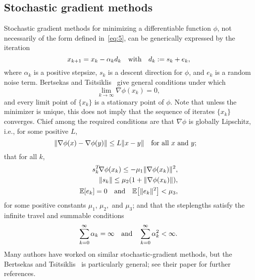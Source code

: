\documentclass[nospthms]{svjour3}
\numberwithin{equation}{section}
\def\norm#1{\|#1\|}
\def\text #1{\hbox{\quad#1\quad}}
\def\T{^T\!}
\def\k{_k}
\def\kp#1{_{k+#1}}
\def\expval{\mathbb{E}}
\begin{document}
\subsection{Stochastic gradient methods}
\label{sec:stochastic}

Stochastic gradient methods for minimizing a differentiable function
$\phi$, not necessarily of the form defined in~\eqref{eq:5}, can be
generically expressed by the iteration
\begin{equation}
  \label{eq:sgIter}
  x\kp1 = x\k - \alpha\k d\k \text{with} d\k := s\k + e\k,
\end{equation}
where $\alpha\k$ is a positive stepsize, $s\k$ is a descent direction
for $\phi$, and $e\k$ is a random noise term.  Bertsekas and
Tsitsiklis~\cite[Prop.~3]{BT:2000} give general conditions under which
\[
\lim_{k\to\infty}\nabla \phi(x\k)=0,
\]
and every limit point of $\{x_k\}$ is a stationary point of $\phi$.
Note that unless the minimizer is unique, this does not imply that the
sequence of iterates $\{x\k\}$ converges. Chief among the required
conditions are that $\nabla \phi$ is globally Lipschitz, i.e., for
some positive $L$,
\begin{equation*}
 \norm{\nabla\phi(x)-\nabla\phi(y)}\le L\norm{x-y}
  \text{for all $x$ and $y$;}
\end{equation*}
that for all $k$,
\begin{subequations} \label{eq:stoch-reqs}
\begin{align}
  \label{eq:grad-related-1}
 s\k\T\nabla \phi(x\k) \le -\mu_1\norm{\nabla \phi(x\k)}^2,
 \\ \label{eq:grad-related-2}
 \norm{s\k} \le \mu_2(1+\norm{\nabla \phi(x\k)}),
 \\\label{eq:NoiseBound}
 \expval[e\k]=0 \text{and} \expval\big[\norm{e\k}^2\big] < \mu_3,
\end{align}
\end{subequations}
for some positive constants $\mu_1$, $\mu_2,$ and $\mu_3$; and that
the steplengths satisfy the infinite travel and summable conditions
\begin{equation}\label{eq:6}
  \sum_{k=0}^\infty \alpha\k=\infty
  \text{and}
  \sum_{k=0}^\infty \alpha_k^2<\infty.
\end{equation}
Many authors have worked on similar stochastic-gradient methods, but
the Bertsekas and Tsitsiklis~\cite{BT:2000} is particularly general;
see their paper for further references.
\end{document}
